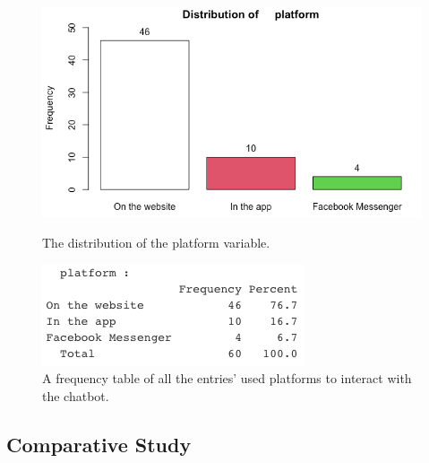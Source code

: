\begin{figure}[!htb]
	\includegraphics[width=\linewidth]{../LaTeX/Figures/Environments/PlatformPlot.png}
	\caption{The distribution of the platform variable.}\label{fig:platformPlot}
	\endminipage\hfill
	\includegraphics[width=\linewidth]{../LaTeX/Figures/Environments/PlatformFreq.png}
	\caption{A frequency table of all the entries' used platforms to interact with the chatbot.}\label{fig:platformFreq}
	\endminipage\hfill
\end{figure}

\FloatBarrier
\subsection{Comparative Study}
